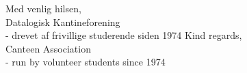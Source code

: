 \documentclass{article}
\providecommand{\content}[0]{}
\begin{document}
\thispagestyle{empty}

\ifnotblank

\ifdanish
\def\header{kantine-tekst}
\else
\def\header{kantine-text}
\fi

\ifportrait
{}
\else
{}
\fi
\null
\vspace{4cm}

\else
\fi %

\newlength{\mywidth}
\setlength{\mywidth}{\textwidth}
\addtolength{\mywidth}{-1cm}
\begin{center}
\begin{minipage}{\mywidth}
\fontsize{16}{16}\selectfont
\content{}
\end{minipage}
\end{center}

\null
\vfill

\ifnotblank

\rm

\Large

\begin{flushright}
\ifdanish
Med venlig hilsen,\\
Datalogisk Kantineforening\\
- drevet af frivillige studerende siden 1974
\else
Kind regards,\\
Canteen Association\\
- run by volunteer students since 1974
\fi
\end{flushright}

\else
\fi %
\end{document}
